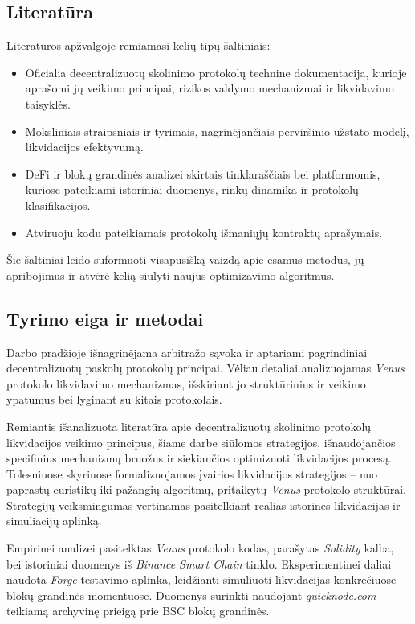 \documentclass[]{VUMIFTemplateClass}
\begin{document}
\subsection*{Literatūra}
Literatūros apžvalgoje remiamasi kelių tipų šaltiniais:
\begin{itemize}
\item Oficialia decentralizuotų skolinimo protokolų technine dokumentacija, kurioje aprašomi jų veikimo principai, rizikos valdymo mechanizmai ir likvidavimo taisyklės.
\item Moksliniais straipsniais ir tyrimais, nagrinėjančiais perviršinio užstato modelį, likvidacijos efektyvumą.
\item DeFi ir blokų grandinės analizei skirtais tinklaraščiais bei platformomis, kuriose pateikiami istoriniai duomenys, rinkų dinamika ir protokolų klasifikacijos.
\item Atviruoju kodu pateikiamais protokolų išmaniųjų kontraktų aprašymais.
\end{itemize}

Šie šaltiniai leido suformuoti visapusišką vaizdą apie esamus metodus, jų apribojimus ir atvėrė kelią siūlyti naujus optimizavimo algoritmus.

\subsection*{Tyrimo eiga ir metodai}
Darbo pradžioje išnagrinėjama arbitražo sąvoka ir aptariami pagrindiniai decentralizuotų paskolų protokolų principai. Vėliau detaliai analizuojamas \textit{Venus} protokolo likvidavimo mechanizmas, išskiriant jo struktūrinius ir veikimo ypatumus bei lyginant su kitais protokolais.

Remiantis išanalizuota literatūra apie decentralizuotų skolinimo protokolų likvidacijos veikimo principus, šiame darbe siūlomos strategijos, išnaudojančios specifinius mechanizmų bruožus ir siekiančios optimizuoti likvidacijos procesą. Tolesniuose skyriuose formalizuojamos įvairios likvidacijos strategijos – nuo paprastų euristikų iki pažangių algoritmų, pritaikytų \textit{Venus} protokolo struktūrai. Strategijų veiksmingumas vertinamas pasitelkiant realias istorines likvidacijas ir simuliacijų aplinką.

Empirinei analizei pasitelktas \textit{Venus} protokolo kodas, parašytas \textit{Solidity} kalba, bei istoriniai duomenys iš \textit{Binance Smart Chain} tinklo. Eksperimentinei daliai naudota \textit{Forge} \cite{forge} testavimo aplinka, leidžianti simuliuoti likvidacijas konkrečiuose blokų grandinės momentuose. Duomenys surinkti naudojant \textit{quicknode.com} teikiamą archyvinę prieigą prie BSC blokų grandinės.
\end{document}
